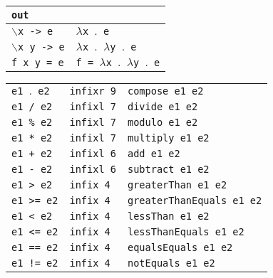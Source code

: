 \begin{table}[H]
\begin{center}
\begin{tabularx}{\textwidth}{|p{16em}|X|}
            \texttt{out}                     &                                                                  \\
            \hline
            \texttt{$\backslash$x -> e}      & \texttt{$\lambda$x $\mathord{.}$ e}                              \\
            \hline
            \texttt{$\backslash$x y -> e}    & \texttt{$\lambda$x $\mathord{.}$ $\lambda$y $\mathord{.}$ e}     \\
            \hline
            \texttt{f x y = e}               & \texttt{f = $\lambda$x $\mathord{.}$ $\lambda$y $\mathord{.}$ e} \\
            \hline
        \end{tabularx}
        \begin{tabularx}{\textwidth}{|p{8em}@{\quad}p{7em}|X|}
            \texttt{e1 $\mathord{.}$ e2} & \texttt{infixr 9} & \texttt{compose e1 e2}            \\
            \texttt{e1 / e2}             & \texttt{infixl 7} & \texttt{divide e1 e2}             \\
            \texttt{e1 \% e2}            & \texttt{infixl 7} & \texttt{modulo e1 e2}             \\
            \texttt{e1 * e2}             & \texttt{infixl 7} & \texttt{multiply e1 e2}           \\
            \texttt{e1 + e2}             & \texttt{infixl 6} & \texttt{add e1 e2}                \\
            \texttt{e1 - e2}             & \texttt{infixl 6} & \texttt{subtract e1 e2}           \\
            \texttt{e1 > e2}             & \texttt{infix 4}  & \texttt{greaterThan e1 e2}        \\
            \texttt{e1 >= e2}            & \texttt{infix 4}  & \texttt{greaterThanEquals e1 e2}  \\
            \texttt{e1 < e2}             & \texttt{infix 4}  & \texttt{lessThan e1 e2}           \\
            \texttt{e1 <= e2}            & \texttt{infix 4}  & \texttt{lessThanEquals e1 e2}     \\
            \texttt{e1 == e2}            & \texttt{infix 4}  & \texttt{equalsEquals e1 e2}       \\
            \texttt{e1 != e2}            & \texttt{infix 4}  & \texttt{notEquals e1 e2}          \\

\end{tabularx}
\end{center}
\end{table}
